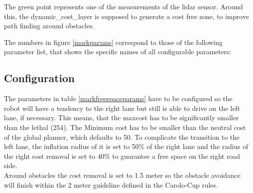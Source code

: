 The green point represents one of the measurements of the lidar sensor. Around this, the dynamic\_cost\_layer is supposed to generate a cost free zone, to improve path finding around obstacles.

The numbers in figure \ref{markparams} correspond to those of the following parameter list, that shows the specific names of all configurable parameters:

\begin{table}[H]
\centering
{}
\caption{MarkeFreeSpace parameters}
\label{markfreespaceparams}
\end{table}

\subsection{Configuration}

The parameters in table \ref{markfreespaceparams} have to be configured so the robot will have a tendency to the right lane but still is able to drive on the left lane, if necessary. This means, that the maxcost has to be significantly smaller than the lethal (254). The Minimum cost has to be smaller than the neutral cost of the global planner, which defaults to 50. To complicate the transition to the left lane, the inflation radius of it is set to 50\% of the right lane and the radius of the right cost removal  is set to 40\% to guarantee a free space on the right road side.\\
Around obstacles the cost removal is set to 1.5 meter so the obstacle avoidance will finish within the 2 meter guideline defined in the Carolo-Cup rules\cite{carolocup}.\\

